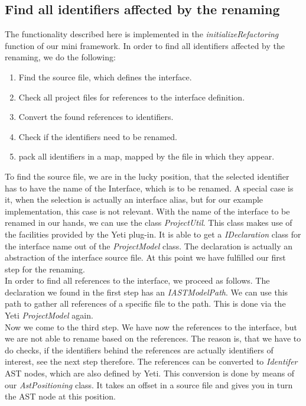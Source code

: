 \documentclass[a4paper,10pt]{report}
\begin{document}
\subsection{Find all identifiers affected by the renaming}
The functionality described here is implemented in the {\it initializeRefactoring} function of our mini framework.
In order to find all identifiers affected by the renaming, we do the following:
   \begin{enumerate}
     \item Find the source file, which defines the interface.
     \item Check all project files for references to the interface definition.
     \item Convert the found references to identifiers.
     \item Check if the identifiers need to be renamed.
     \item pack all identifiers in a map, mapped by the file in which they appear.
   \end{enumerate}
To find the source file, we are in the lucky position, that the selected identifier has to have the name of the Interface, which is to be renamed. 
A special case is it, when the selection is actually an interface alias, but for our example implementation, this case is not relevant. 
With the name of the interface to be renamed in our hands, we can use the class {\it ProjectUtil}.
This class makes use of the facilities provided by the Yeti plug-in.
It is able to get a {\it IDeclaration} class for the interface name out of the {\it ProjectModel} class.
The declaration is actually an abstraction of the interface source file. 
At this point we have fulfilled our first step for the renaming.\\
In order to find all references to the interface, we proceed as follows. The declaration we found in the first step has an {\it IASTModelPath}. 
We can use this path to gather all references of a specific file to the path. This is done via the Yeti {\it ProjectModel} again.\\
Now we come to the third step. We have now the references to the interface, but we are not able to rename based on the references.
The reason is, that we have to do checks, if the identifiers behind the references are actually identifiers of interest, see the next step therefore.
The references can be converted to {\it Identifer} AST nodes, which are also defined by Yeti.
This conversion is done by means of our {\it AstPositioning} class.
It takes an offset in a source file and gives you in turn the AST node at this position. 
\end{document}
